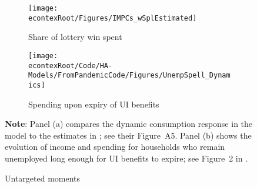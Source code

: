 \documentclass[\econtexRoot/HAFiscal]{subfiles}
\begin{document}
\begin{figure}[htb]
    \centering
    \begin{subfigure}[b]{.48\linewidth}
        \centering
        \texttt{[image: \\econtexRoot/Figures/IMPCs\_wSplEstimated]}
        \caption{Share of lottery win spent}
        \notinsubfile{\label{fig:USaggmpclotterywin}}
    \end{subfigure}%
    \begin{subfigure}[b]{.48\linewidth}
        \centering
        \texttt{[image: \\econtexRoot/Code/HA-Models/FromPandemicCode/Figures/UnempSpell\_Dynamics]}
        \caption{Spending upon expiry of UI benefits}
        \notinsubfile{\label{fig:expiryUI}}
    \end{subfigure}
    \caption{Untargeted moments}
    \notinsubfile{\label{fig:untargetedMoments}}
    \parbox{16cm}{\small \vspace{.15cm} \textbf{Note}: Panel (a) compares the dynamic consumption response in the model to the estimates in \citet{fagereng_mpc_2021}; see their Figure~A5. Panel (b) shows the evolution of income and spending for households who remain unemployed long enough for UI benefits to expire; see Figure~2 in \citet{ganongConsumer2019}.\normalsize}
  \end{figure}
  
\end{document}
